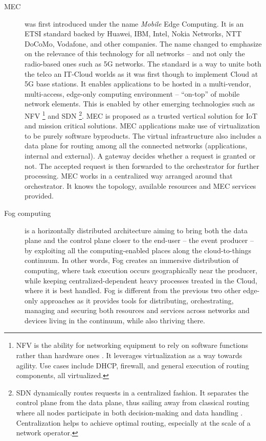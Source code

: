 \documentclass[11pt]{sdm}
\begin{document}
\begin{description}
	\item[\acrfull{MEC}] was first introduced under the name \emph{Mobile} Edge Computing. It is an \gls{ETSI} standard backed by Huawei, IBM, Intel, Nokia Networks, NTT DoCoMo, Vodafone, and other companies. The name changed to emphasize on the relevance of this technology for all networks -- and not only the radio-based ones such as 5G networks. The standard is a way to unite both the telco an IT-Cloud worlds \cite{dahmen-lhuissier_etsi_nodate-1} as it was first though to implement Cloud at 5G base stations. It enables applications to be hosted in a multi-vendor, multi-access, edge-only computing environment -- ``on-top'' of mobile network elements. This is enabled by other emerging technologies such as \gls{NFV} \footnote{\acrfull{NFV} is the ability for networking equipment to rely on software functions rather than hardware ones \cite{redhat_what_2019}. It leverages virtualization as a way towards agility. Use cases include DHCP, firewall, and general execution of routing components, all virtualized.} and \gls{SDN} \footnote{\acrfull{SDN} dynamically routes requests in a centralized fashion. It separates the control plane from the data plane, thus sailing away from classical routing where all nodes participate in both decision-making and data handling \cite{redhat_what_2019}. Centralization helps to achieve optimal routing, especially at the scale of a network operator.}. \gls{MEC} is proposed as a trusted vertical solution for \gls{IoT} and mission critical solutions. \gls{MEC} applications make use of virtualization to be purely software byproducts. The virtual infrastructure also includes a data plane for routing among all the connected networks (applications, internal and external). A gateway decides whether a request is granted or not. The accepted request is then forwarded to the orchestrator for further processing. \gls{MEC} works in a centralized way arranged around that orchestrator. It knows the topology, available resources and \gls{MEC} services provided.
	
	\item[Fog computing] is a horizontally distributed architecture aiming to bring both the data plane and the control plane closer to the end-user -- the event producer -- by exploiting all the computing-enabled places along the cloud-to-things continuum. In other words, Fog creates an immersive distribution of computing, where task execution occurs geographically near the producer, while keeping centralized-dependent heavy processes treated in the Cloud, where it is best handled. Fog is different from the previous two other edge-only approaches as it provides tools for distributing, orchestrating, managing and securing both resources and services across networks and devices living in the continuum, while also thriving there.
	

\end{description}
\end{document}
